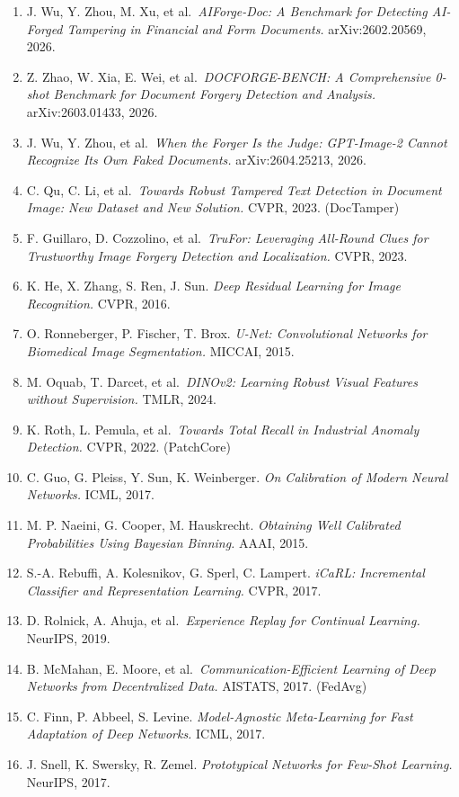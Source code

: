 \begin{enumerate}
\def\labelenumi{\arabic{enumi}.}
\tightlist
\item
  J. Wu, Y. Zhou, M. Xu, et al.~\emph{AIForge-Doc: A Benchmark for Detecting AI-Forged Tampering in Financial and Form Documents.} arXiv:2602.20569, 2026.
\item
  Z. Zhao, W. Xia, E. Wei, et al.~\emph{DOCFORGE-BENCH: A Comprehensive 0-shot Benchmark for Document Forgery Detection and Analysis.} arXiv:2603.01433, 2026.
\item
  J. Wu, Y. Zhou, et al.~\emph{When the Forger Is the Judge: GPT-Image-2 Cannot Recognize Its Own Faked Documents.} arXiv:2604.25213, 2026.
\item
  C. Qu, C. Li, et al.~\emph{Towards Robust Tampered Text Detection in Document Image: New Dataset and New Solution.} CVPR, 2023. (DocTamper)
\item
  F. Guillaro, D. Cozzolino, et al.~\emph{TruFor: Leveraging All-Round Clues for Trustworthy Image Forgery Detection and Localization.} CVPR, 2023.
\item
  K. He, X. Zhang, S. Ren, J. Sun. \emph{Deep Residual Learning for Image Recognition.} CVPR, 2016.
\item
  O. Ronneberger, P. Fischer, T. Brox. \emph{U-Net: Convolutional Networks for Biomedical Image Segmentation.} MICCAI, 2015.
\item
  M. Oquab, T. Darcet, et al.~\emph{DINOv2: Learning Robust Visual Features without Supervision.} TMLR, 2024.
\item
  K. Roth, L. Pemula, et al.~\emph{Towards Total Recall in Industrial Anomaly Detection.} CVPR, 2022. (PatchCore)
\item
  C. Guo, G. Pleiss, Y. Sun, K. Weinberger. \emph{On Calibration of Modern Neural Networks.} ICML, 2017.
\item
  M. P. Naeini, G. Cooper, M. Hauskrecht. \emph{Obtaining Well Calibrated Probabilities Using Bayesian Binning.} AAAI, 2015.
\item
  S.-A. Rebuffi, A. Kolesnikov, G. Sperl, C. Lampert. \emph{iCaRL: Incremental Classifier and Representation Learning.} CVPR, 2017.
\item
  D. Rolnick, A. Ahuja, et al.~\emph{Experience Replay for Continual Learning.} NeurIPS, 2019.
\item
  B. McMahan, E. Moore, et al.~\emph{Communication-Efficient Learning of Deep Networks from Decentralized Data.} AISTATS, 2017. (FedAvg)
\item
  C. Finn, P. Abbeel, S. Levine. \emph{Model-Agnostic Meta-Learning for Fast Adaptation of Deep Networks.} ICML, 2017.
\item
  J. Snell, K. Swersky, R. Zemel. \emph{Prototypical Networks for Few-Shot Learning.} NeurIPS, 2017.
\end{enumerate}
